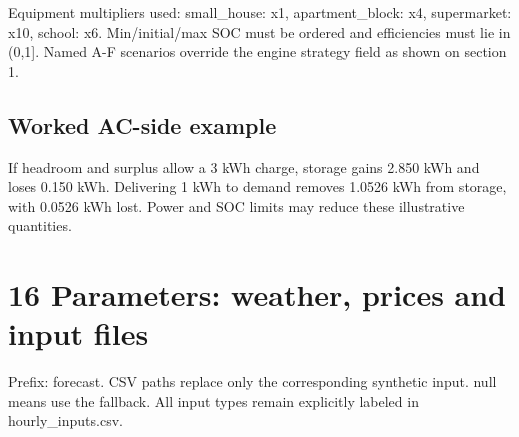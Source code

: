 \documentclass[a4paper,11pt]{article}
\begin{document}
Equipment multipliers used: small\_house: x1, apartment\_block: x4, supermarket: x10, school: x6. Min/initial/max SOC must be ordered and efficiencies must lie in (0,1]. Named A-F scenarios override the engine strategy field as shown on section 1.
\par\medskip

\subsection*{Worked AC-side example}
\par\medskip

If headroom and surplus allow a 3 kWh charge, storage gains 2.850 kWh and loses 0.150 kWh. Delivering 1 kWh to demand removes 1.0526 kWh from storage, with 0.0526 kWh lost. Power and SOC limits may reduce these illustrative quantities.
\par\medskip

\clearpage

\section*{16  Parameters: weather, prices and input files}
\par\medskip

Prefix: forecast. CSV paths replace only the corresponding synthetic input. null means use the fallback. All input types remain explicitly labeled in hourly\_inputs.csv.
\par\medskip
\end{document}
